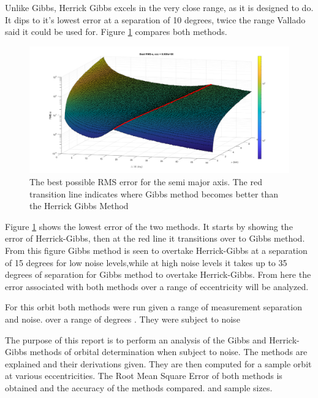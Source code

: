 \documentclass[12pt]{article}
\begin{document}
	Unlike Gibbs, Herrick Gibbs excels in the very close range, as it is designed to do. It dips to it's lowest error at a separation of 10 degrees, twice the range Vallado  \cite{vallado2007fundamentals} said it could be used for. Figure \ref{fig:bestmethodscirc} compares both methods.

\begin{figure}[H]
	\centering
	\includegraphics[width=0.7\linewidth]{bestMethodsCirc}
	\caption{The best possible RMS error for the semi major axis. The red transition line indicates where Gibbs method becomes better than the Herrick Gibbs Method}
	\label{fig:bestmethodscirc}
\end{figure}
	Figure \ref{fig:bestmethodscirc} shows the lowest error of the two methods. It starts by showing the error of Herrick-Gibbs, then at the red line it transitions over to Gibbs method. From this figure Gibbs method is seen to overtake Herrick-Gibbs at a separation of 15 degrees for low noise levels,while at high noise levels it takes up to 35 degrees of separation for Gibbs method to overtake Herrick-Gibbs. From here the error associated with both methods over a range of eccentricity will be analyzed.\par 
	
	\iffalse
	
	
	For this orbit both methods were run given a range of measurement separation and noise.  over a range of degrees . They were subject to noise
	
	The purpose of this report is to perform an analysis of the Gibbs and Herrick-Gibbs methods of orbital determination when subject to noise. The methods are explained and their derivations given. They are then computed for a sample orbit at various eccentricities. The Root Mean Square Error of both methods is obtained and the accuracy of the methods compared.   and sample sizes. 
	
\end{document}
